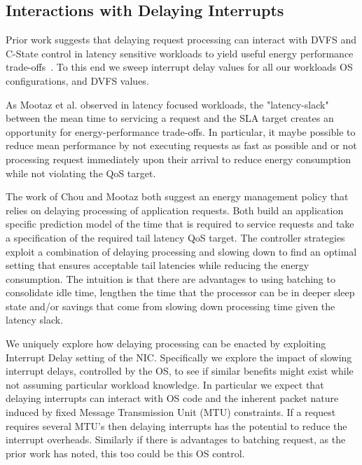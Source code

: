 


\subsection{Interactions with Delaying Interrupts}
\label{sec:workflow:itr}
Prior work suggests that delaying request processing can interact with DVFS and C-State control in latency sensitive workloads to yield useful energy performance trade-offs~\cite{mootaz, udpm}. To this end we sweep interrupt delay values for all our workloads OS configurations, and DVFS values.

As Mootaz et al.\cite{mootaz} observed in latency focused workloads, the "latency-slack" between the mean time to servicing a request and the SLA target creates an opportunity for energy-performance trade-offs.  In particular, it maybe possible to reduce mean performance by not executing requests as fast as possible and or not processing request immediately upon their arrival to reduce energy consumption while not violating the QoS target.  

The work of Chou and Mootaz both suggest an energy management policy that relies on delaying processing of application requests. Both build an application specific prediction model of the time that is required to service requests and take a specification of the required tail latency QoS target. The  controller strategies exploit a combination of delaying processing and slowing down to find an optimal setting that ensures acceptable tail latencies while reducing the energy consumption.  The intuition is that there are advantages to using batching to consolidate idle time, lengthen the time that the processor can be in deeper sleep state and/or savings that come from slowing down processing time given the latency slack.    

We uniquely explore how delaying processing can be enacted by exploiting Interrupt Delay setting of the NIC. Specifically we explore the impact of slowing interrupt delays, controlled by the OS, to see if similar benefits might exist while not assuming particular workload knowledge.  In particular we expect that delaying interrupts can interact with OS code and the inherent packet nature induced by fixed Message Transmission Unit (MTU) constraints. If a request requires several MTU's then delaying interrupts has the potential to reduce the interrupt overheads. Similarly if there is advantages to batching request, as the prior work has noted, this too could be this OS control.

